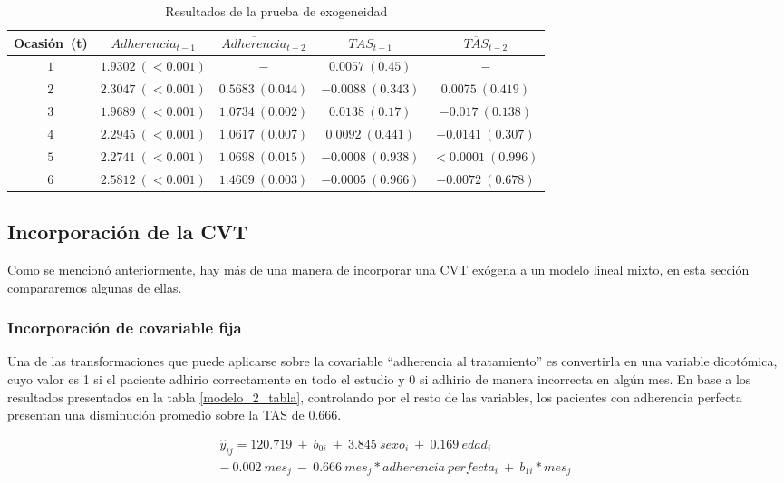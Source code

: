 \documentclass[spanish]{article}
\numberwithin{figure}{subsection}
\numberwithin{equation}{subsection}
\numberwithin{table}{subsection}
\begin{document}
\begin{table}[H]
	\centering
	\caption{Resultados de la prueba de exogeneidad}
	\label{exog_table}
	\begin{tabular}{*{5}{|c}|}
		\hline
		Ocasión\ (t) & $Adherencia_{t-1}$ & $\overline{Adherencia}_{t-2}$ & $TAS_{t-1}$ &
		$\overline{TAS}_{t-2}$ \\
		\hline
		\hline
		$1$ & $1.9302\ (<0.001)$ & $-$ & $0.0057\ (0.45)$ & $-$ \\
		$2$ & $2.3047\ (<0.001)$ & $0.5683\ (0.044)$ & $-0.0088\ (0.343)$ &
		$0.0075\ (0.419)$ \\
		$3$ & $1.9689\ (<0.001)$ & $1.0734\ (0.002)$ & $0.0138\ (0.17)$ &
		$-0.017\ (0.138)$ \\
		$4$ & $2.2945\ (<0.001)$ & $1.0617\ (0.007)$ & $0.0092\ (0.441)$ &
		$-0.0141\ (0.307)$ \\
		$5$ & $2.2741\ (<0.001)$ & $1.0698\ (0.015)$ & $-0.0008\ (0.938)$ &
		$<0.0001\ (0.996)$ \\
		$6$ & $2.5812\ (<0.001)$ & $1.4609\ (0.003)$ & $-0.0005\ (0.966)$ &
		$-0.0072\ (0.678)$ \\
		\hline
	\end{tabular}
\end{table}

\subsection{Incorporación de la CVT}

Como se mencionó anteriormente, hay más de una manera de incorporar una CVT
exógena a un modelo lineal mixto, en esta sección compararemos algunas de ellas.

\subsubsection{Incorporación de covariable fija}

Una de las transformaciones que puede aplicarse sobre la covariable ``adherencia
al tratamiento'' es convertirla en una variable dicotómica, cuyo valor es 1 si
el paciente adhirio correctamente en todo el estudio y 0 si adhirio de manera
incorrecta en algún mes. En base a los resultados presentados en la tabla
\ref{modelo_2_tabla}, controlando por el resto de las variables, los pacientes con
adherencia perfecta presentan una disminución promedio sobre la TAS de 0.666.

\begin{multline}
	\label{modelo_2}
	\hat{y}_{ij} = 120.719\ +\ b_{0i}\ +\ 3.845\ sexo_i\ +\ 0.169\ edad_i\ \\
	-\ 0.002\ mes_j\ -\ 0.666\ mes_j*adherencia\ perfecta_i\ +\ b_{1i}*mes_j\
\end{multline}
\end{document}
